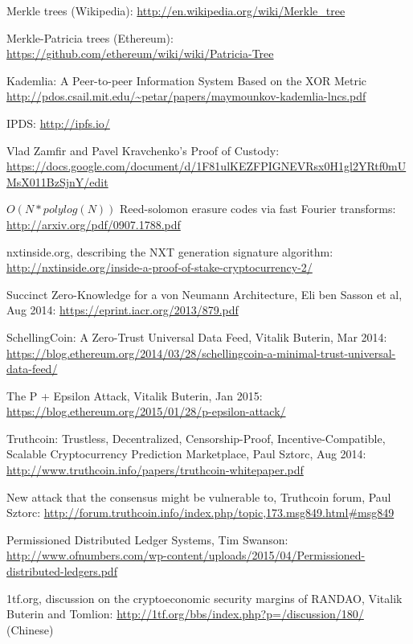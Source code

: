\documentclass[11pt,a4paper]{article}
\theoremstyle{plain}
\theoremstyle{definition}
\theoremstyle{remark}
\begin{document}
\begin{thebibliography}{39}
    Merkle trees (Wikipedia): \url{http://en.wikipedia.org/wiki/Merkle_tree}

    Merkle-Patricia trees (Ethereum): \url{https://github.com/ethereum/wiki/wiki/Patricia-Tree}

    Kademlia: A Peer-to-peer Information System Based on the XOR Metric \url{http://pdos.csail.mit.edu/~petar/papers/maymounkov-kademlia-lncs.pdf}

    IPDS: \url{http://ipfs.io/}

    Vlad Zamfir and Pavel Kravchenko's Proof of Custody: \url{https://docs.google.com/document/d/1F81ulKEZFPIGNEVRsx0H1gl2YRtf0mUMsX011BzSjnY/edit}

    $O(N*polylog(N))$ Reed-solomon erasure codes via fast Fourier transforms: \url{http://arxiv.org/pdf/0907.1788.pdf}

    nxtinside.org, describing the NXT generation signature algorithm: \url{http://nxtinside.org/inside-a-proof-of-stake-cryptocurrency-2/}

    Succinct Zero-Knowledge for a von Neumann Architecture, Eli ben Sasson et al, Aug 2014: \url{https://eprint.iacr.org/2013/879.pdf}

    SchellingCoin: A Zero-Trust Universal Data Feed, Vitalik Buterin, Mar 2014: \url{https://blog.ethereum.org/2014/03/28/schellingcoin-a-minimal-trust-universal-data-feed/}

    The P + Epsilon Attack, Vitalik Buterin, Jan 2015: \url{https://blog.ethereum.org/2015/01/28/p-epsilon-attack/}

    Truthcoin: Trustless, Decentralized, Censorship-Proof, Incentive-Compatible, Scalable Cryptocurrency Prediction Marketplace, Paul Sztorc, Aug 2014: \url{http://www.truthcoin.info/papers/truthcoin-whitepaper.pdf}

    New attack that the consensus might be vulnerable to, Truthcoin forum, Paul Sztorc: \url{http://forum.truthcoin.info/index.php/topic,173.msg849.html#msg849}

    Permissioned Distributed Ledger Systems, Tim Swanson: \url{http://www.ofnumbers.com/wp-content/uploads/2015/04/Permissioned-distributed-ledgers.pdf}

    1tf.org, discussion on the cryptoeconomic security margins of RANDAO, Vitalik Buterin and Tomlion: \url{http://1tf.org/bbs/index.php?p=/discussion/180/} (Chinese)


\end{thebibliography}
\end{document}
